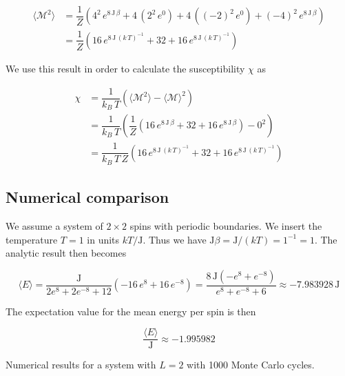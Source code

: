 \documentclass[a4paper, fontsize=11pt]{article}
\begin{document}
\begin{align}
\langle \mathcal{M}^2 \rangle &= \dfrac{1}{Z} \left( 4^2 \, e^{8 \, \text{J} \, \beta} + 4 \, (2^2 \, e^0 ) + 4 \, ((-2)^2 \, e^0) + (-4)^2 \, e^{8 \, \text{J} \, \beta} \right) 
\\
&=\dfrac{1}{Z} \left( 16 \, e^{8 \, \text{J} \, (k \, T)^{-1}} + 32 + 16 \, e^{8 \, \text{J} \, (k \, T)^{-1}} \right) 
\end{align}

We use this result in order to calculate the susceptibility $\chi$ as

\begin{align}
\chi &= \dfrac{1}{k_{B} \, T} \left( \langle \mathcal{M}^2 \rangle - \langle \mathcal{M} \rangle^2 \right)
\\
&=\dfrac{1}{k_{B} \, T} \left( \dfrac{1}{Z} \left( 16 \, e^{8 \, \text{J} \, \beta} + 32 + 16 \, e^{8 \, \text{J} \, \beta} \right)  - 0^2 \right)
\\
&= 
\dfrac{1}{k_{B} \, T \, Z} \left( 16 \, e^{8 \, \text{J} \, (k \, T)^{-1}} + 32 + 16 \, e^{8 \, \text{J} \, (k \, T)^{-1}} \right) 
\end{align}


\cite{H-Jensen}

\subsection{Numerical comparison}

We assume a system of $2 \times 2$ spins with periodic boundaries. We insert the temperature $T = 1$ in units $kT/\text{J}$. Thus we have $\text{J} \beta = \text{J}/(kT) = 1^{-1} = 1$. The analytic result then becomes 

\begin{equation}
\langle E \rangle = \dfrac{\text{J}}{2e^{8} + 2e^{-8} + 12} \left(-16\, e^{8} + 16 \, e^{-8} \right) = \dfrac{8\, \text{J}\left(- e^{8} + e^{-8} \right)}{e^{8} + e^{-8} + 6} \approx -7.983928 \, \text{J}
\end{equation}

The expectation value for the mean energy per spin is then

\begin{equation}
\dfrac{\langle E \rangle}{\text{J}} \approx -1.995982
\end{equation}



\begin{table}[h!tb]
\centering
{}
\caption{Numerical results for a system with $L=2$ with 1000 Monte Carlo cycles.}
\end{table}
\end{document}
